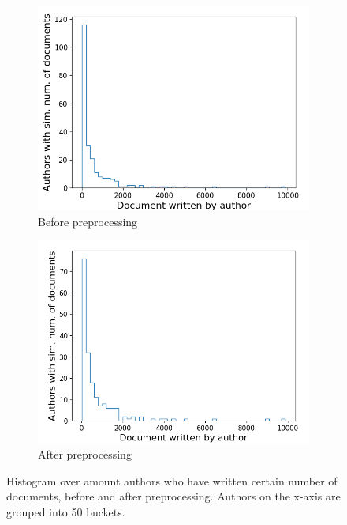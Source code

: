 \begin{figure}[ht]
	\centering
	\begin{subfigure}{0.45\textwidth}
		\centering
		\includegraphics[width=\linewidth]{figures/author_hist2_before.png}
		\caption{Before preprocessing}
		\label{fig:author_hist_before}
	\end{subfigure}
	\begin{subfigure}{0.45\textwidth}
		\centering
		\includegraphics[width=\linewidth]{figures/author_hist2_14.png}
		\caption{After preprocessing}
		\label{fig:auhtor_hist_after}
	\end{subfigure}
	\caption{Histogram over amount authors who have written certain number of documents, before and after preprocessing.
		Authors on the x-axis are grouped into 50 buckets.}
	\label{fig:author_hist}
\end{figure}

